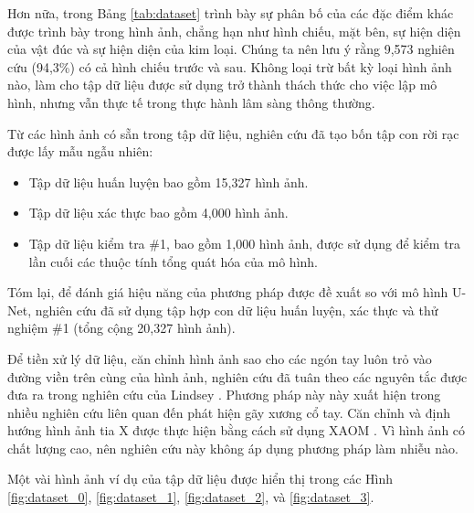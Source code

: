 \documentclass[../the.tex]{subfiles}
\begin{document}
{\fontsize{13}{12} \selectfont
Hơn nữa, trong Bảng \ref{tab:dataset} trình bày sự phân bố của các đặc điểm khác được trình bày trong hình ảnh, chẳng hạn như hình chiếu, mặt bên, sự hiện diện của vật đúc và sự hiện diện của kim loại. Chúng ta nên lưu ý rằng 9,573 nghiên cứu (94,3\%) có cả hình chiếu trước và sau. Không loại trừ bất kỳ loại hình ảnh nào, làm cho tập dữ liệu được sử dụng trở thành thách thức cho việc lập mô hình, nhưng vẫn thực tế trong thực hành lâm sàng thông thường.

Từ các hình ảnh có sẵn trong tập dữ liệu, nghiên cứu đã tạo bốn tập con rời rạc được lấy mẫu ngẫu nhiên:

\begin{itemize}
  \item Tập dữ liệu huấn luyện bao gồm 15,327 hình ảnh.

  \item Tập dữ liệu xác thực bao gồm 4,000 hình ảnh.
   
  \item Tập dữ liệu kiểm tra \#1, bao gồm 1,000 hình ảnh, được sử dụng để kiểm tra lần cuối các thuộc tính tổng quát hóa của mô hình.
  
\end{itemize}

Tóm lại, để đánh giá hiệu năng của phương pháp được đề xuất so với mô hình U-Net, nghiên cứu đã sử dụng tập hợp con dữ liệu huấn luyện, xác thực và thử nghiệm \#1 (tổng cộng 20,327 hình ảnh).

Để tiền xử lý dữ liệu, căn chỉnh hình ảnh sao cho các ngón tay luôn trỏ vào đường viền trên cùng của hình ảnh,  nghiên cứu đã tuân theo các nguyên tắc được đưa ra trong nghiên cứu của Lindsey \etal  \cite{Lindsey1806905115}. Phương pháp này này xuất hiện trong nhiều nghiên cứu liên quan đến phát hiện gãy xương cổ tay. Căn chỉnh và định hướng hình ảnh tia X được thực hiện bằng cách sử dụng XAOM \cite{HRZIC2021104300}. Vì hình ảnh có chất lượng cao, nên  nghiên cứu này không áp dụng phương pháp làm nhiễu nào.

Một vài hình ảnh ví dụ của tập dữ liệu được hiển thị trong các Hình \ref{fig:dataset_0}, \ref{fig:dataset_1}, \ref{fig:dataset_2}, và \ref{fig:dataset_3}.
}
\end{document}
